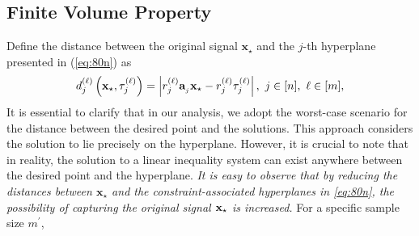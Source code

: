 \documentclass[12pt,draftcls,onecolumn]{IEEEtran}
\begin{document}
\subsection{Finite Volume Property}
\label{penalt}
Define the distance between the original signal $\mathbf{x}_{\star}$ and the $j$-th hyperplane presented in (\ref{eq:80n}) as 
\begin{equation}
\label{distance}
d^{(\ell)}_{j}\left(\mathbf{x}_{\star},\tau_{j}^{(\ell)}\right)=\left|r^{(\ell)}_{j}\mba_{_j}\mathbf{x}_{\star}-r^{(\ell)}_{j}\tau^{(\ell)}_{j}\right|,~j\in [n],~ \ell\in[m],%
\end{equation}\normalsize 
It is essential to clarify that in our analysis, we adopt the worst-case scenario for the distance between the desired point and the solutions. This approach considers the solution to lie precisely on the hyperplane. However, it is crucial to note that in reality, the solution to a linear inequality system can exist anywhere between the desired point and the hyperplane. \emph{It is easy to observe that by reducing the distances between $\mathbf{x}_{\star}$ and the constraint-associated hyperplanes in \eqref{eq:80n}, the possibility of capturing the original signal $\mathbf{x}_{\star}$ is increased.} For a specific sample size $m^{\prime}$, 
\end{document}
